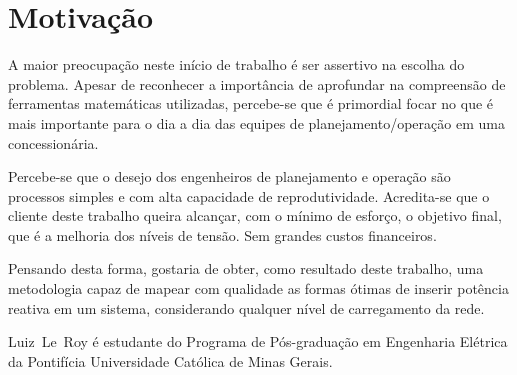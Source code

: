 \documentclass{IEEEtran}
\begin{document}
\section{Motivação}
A maior preocupação neste início de trabalho é ser assertivo na escolha do problema. Apesar de reconhecer a importância de aprofundar na compreensão de ferramentas matemáticas utilizadas, percebe-se que é primordial focar no que é mais importante para o dia a dia das equipes de planejamento/operação em uma concessionária.

Percebe-se que o desejo dos engenheiros de planejamento e operação são processos simples e com alta capacidade de reprodutividade. Acredita-se que o cliente deste trabalho queira alcançar, com o mínimo de esforço, o objetivo final, que é a melhoria dos níveis de tensão. Sem grandes custos financeiros.

Pensando desta forma, gostaria de obter, como resultado deste trabalho, uma metodologia capaz de mapear com qualidade as formas ótimas de inserir potência reativa em um sistema, considerando qualquer nível de carregamento da rede.


\ifCLASSOPTIONcaptionsoff
  \newpage
\fi




\begin{IEEEbiographynophoto}{Luiz~Le~Roy}
é estudante do Programa de Pós-graduação em Engenharia Elétrica da Pontif\'icia Universidade Cat\'olica de Minas Gerais.
\end{IEEEbiographynophoto}

\end{document}
